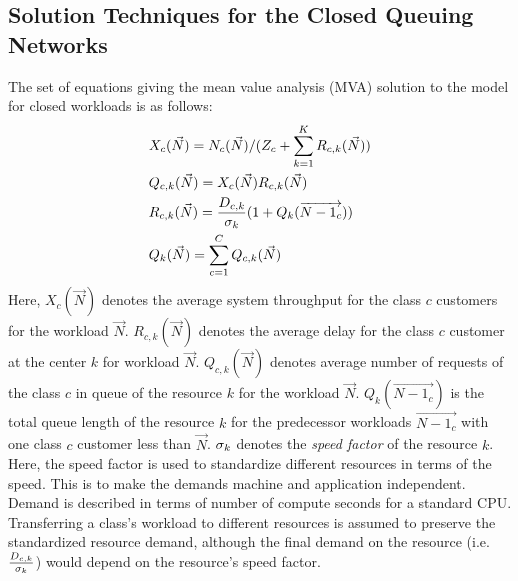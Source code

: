   \subsection{Solution Techniques for the Closed Queuing Networks  }   
 The set of equations giving the mean value analysis (MVA) solution to the model for closed workloads is as follows: 
\begin{align} 
& X_c(\vec{N})=N_c(\vec{N})/(Z_c+\sum_{k=1}^K R_{c,k}(\vec{N})) \label{eq:queuing-model1} \\
& Q_{c,k}(\vec{N})=X_c(\vec{N}) R_{c,k}(\vec{N}) \label{eq:queuing-model2} \\
& R_{c,k}(\vec{N}) = \frac{D_{c,k}}{\sigma_k} (1+Q_k(\overrightarrow{N-1_c})) \label{eq:queuing-model3} \\
& Q_k(\vec{N})=\sum_{c=1}^{C} Q_{c,k}(\vec{N})  \label{eq:queuing-model4}  
\end{align}  
    Here, $X_c(\vec{N})$ denotes the average system throughput for the class $c$ customers for the workload $\vec{N}$.
  $R_{c,k}(\vec{N})$ denotes the average delay for the class $c$ customer at the center $k$ for workload $\vec{N}$.
   $Q_{c,k}(\vec{N})$ denotes average number of requests of the class $c$ in queue of the resource $k$ for the workload $\vec{N}$.
    $Q_k(\overrightarrow{N-1_c})$ is the total queue length of the resource $k$ for the predecessor workloads $\overrightarrow{N-1_c}$ with one class $c$ customer less than $\vec{N}$. 
 $\sigma_k$ denotes the \textit{speed factor} of the resource $k$. 
 Here, the speed factor is used to standardize different resources in terms of the speed. This is to make the demands machine and application independent. Demand is described in terms of number of compute seconds for a standard CPU. Transferring a class's workload to different resources is assumed to preserve the standardized resource demand, although the final demand on the resource (i.e. $\frac{D_{c,k}}{\sigma_k}$) would depend on the resource's speed factor.  
 
